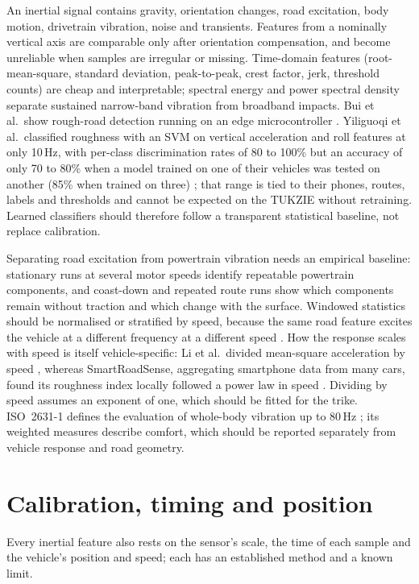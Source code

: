 An inertial signal contains gravity, orientation changes, road excitation, body motion, drivetrain vibration, noise and transients. Features from a nominally vertical axis are comparable only after orientation compensation, and become unreliable when samples are irregular or missing. Time-domain features (root-mean-square, standard deviation, peak-to-peak, crest factor, jerk, threshold counts) are cheap and interpretable; spectral energy and power spectral density separate sustained narrow-band vibration from broadband impacts. Bui et al.\ show rough-road detection running on an edge microcontroller \cite{bui2026}. Yiliguoqi et al.\ classified roughness with an SVM on vertical acceleration and roll features at only 10\,Hz, with per-class discrimination rates of 80 to 100\% but an accuracy of only 70 to 80\% when a model trained on one of their vehicles was tested on another (85\% when trained on three) \cite{yiliguoqi2026}; that range is tied to their phones, routes, labels and thresholds and cannot be expected on the TUKZIE without retraining. Learned classifiers should therefore follow a transparent statistical baseline, not replace calibration.

Separating road excitation from powertrain vibration needs an empirical baseline: stationary runs at several motor speeds identify repeatable powertrain components, and coast-down and repeated route runs show which components remain without traction and which change with the surface. Windowed statistics should be normalised or stratified by speed, because the same road feature excites the vehicle at a different frequency at a different speed \cite{li2018}. How the response scales with speed is itself vehicle-specific: Li et al.\ divided mean-square acceleration by speed \cite{li2018}, whereas SmartRoadSense, aggregating smartphone data from many cars, found its roughness index locally followed a power law in speed \cite{alessandroni2017}. Dividing by speed assumes an exponent of one, which should be fitted for the trike. ISO~2631-1 defines the evaluation of whole-body vibration up to 80\,Hz \cite{iso2631}; its weighted measures describe comfort, which should be reported separately from vehicle response and road geometry.

\section{Calibration, timing and position}
\label{sec:lit-calibration}

Every inertial feature also rests on the sensor's scale, the time of each sample and the vehicle's position and speed; each has an established method and a known limit.

